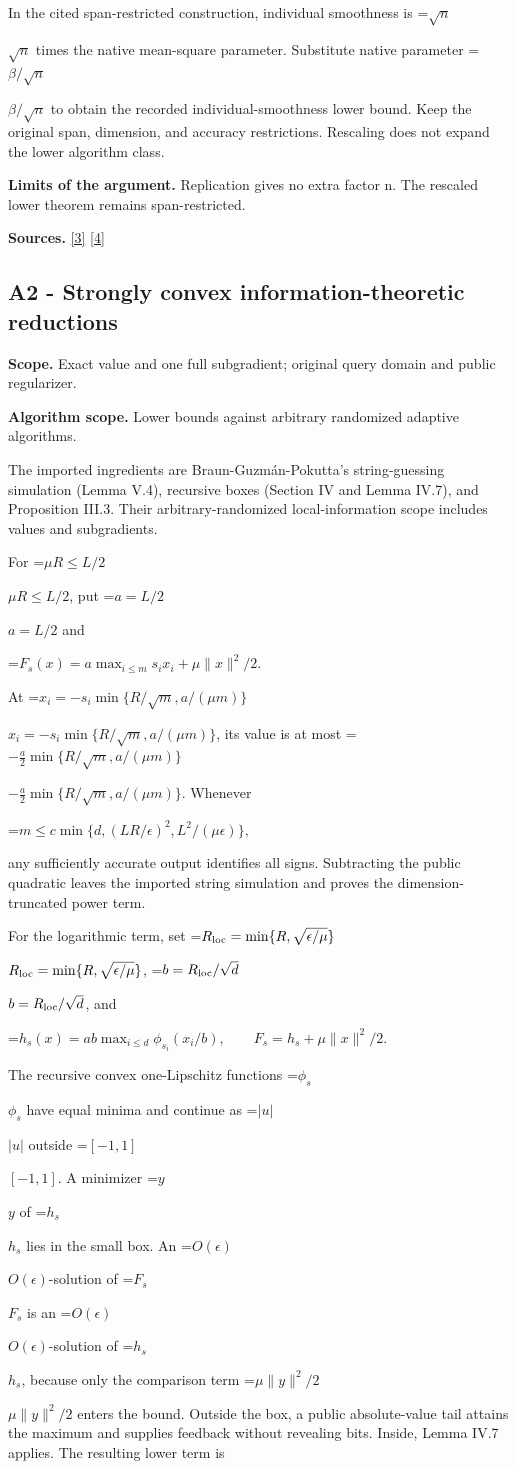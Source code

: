 \documentclass[10pt,a4paper]{article}
\newcommand{\AtlasMath}[1]{\par\begingroup\centering\setbox0=\hbox{$\displaystyle #1$}\ifdim\wd0>1.4\linewidth\typeout{ATLAS WIDE FORMULA: \the\wd0}\fi\ifdim\wd0>\linewidth\resizebox{\linewidth}{!}{\box0}\else\box0\fi\par\endgroup}
\newcommand{\AtlasInlineMath}[1]{\begingroup\setbox0=\hbox{$#1$}\ifdim\wd0>.4\linewidth\endgroup\AtlasMath{#1}\else\endgroup$#1$\fi}
\begin{document}
In the cited span-restricted construction, individual smoothness is \AtlasInlineMath{\sqrt n} times the native mean-square parameter. Substitute native parameter \AtlasInlineMath{\beta/\sqrt n} to obtain the recorded individual-smoothness lower bound. Keep the original span, dimension, and accuracy restrictions. Rescaling does not expand the lower algorithm class.

\textbf{Limits of the argument.} Replication gives no extra factor n. The rescaled lower theorem remains span-restricted.

\textbf{Sources.} \href{https://proceedings.mlr.press/v97/zhou19b/zhou19b.pdf}{[3]} \href{https://arxiv.org/pdf/1405.4980}{[4]}

\subsection{A2 - Strongly convex information-theoretic reductions}
\textbf{Scope.} Exact value and one full subgradient; original query domain and public regularizer.

\textbf{Algorithm scope.} Lower bounds against arbitrary randomized adaptive algorithms.

The imported ingredients are Braun-Guzmán-Pokutta's string-guessing simulation (Lemma V.4), recursive boxes (Section IV and Lemma IV.7), and Proposition III.3. Their arbitrary-randomized local-information scope includes values and subgradients.

For \AtlasInlineMath{\mu R\le L/2}, put \AtlasInlineMath{a=L/2} and

\AtlasMath{F_s(x)=a\max_{i\le m}s_ix_i+\mu\|x\|^2/2.}

At \AtlasInlineMath{x_i=-s_i\min\{R/\sqrt m,a/(\mu m)\}}, its value is at most
\AtlasInlineMath{-\tfrac a2\min\{R/\sqrt m,a/(\mu m)\}}.
Whenever


\AtlasMath{m\le c\min\{d,(LR/\epsilon)^2,L^2/(\mu\epsilon)\},}


any sufficiently accurate output identifies all signs. Subtracting the public quadratic leaves the imported string simulation and proves the dimension-truncated power term.

For the logarithmic term, set \AtlasInlineMath{R_{\rm loc}=\min\{R,\sqrt{\epsilon/\mu}\}}, \AtlasInlineMath{b=R_{\rm loc}/\sqrt d}, and

\AtlasMath{h_s(x)=ab\max_{i\le d}\phi_{s_i}(x_i/b),\qquad
F_s=h_s+\mu\|x\|^2/2.}

The recursive convex one-Lipschitz functions \AtlasInlineMath{\phi_s} have equal minima and continue as \AtlasInlineMath{|u|} outside \AtlasInlineMath{[-1,1]}. A minimizer \AtlasInlineMath{y} of \AtlasInlineMath{h_s} lies in the small box. An \AtlasInlineMath{O(\epsilon)}-solution of \AtlasInlineMath{F_s} is an \AtlasInlineMath{O(\epsilon)}-solution of \AtlasInlineMath{h_s}, because only the comparison term \AtlasInlineMath{\mu\|y\|^2/2} enters the bound. Outside the box, a public absolute-value tail attains the maximum and supplies feedback without revealing bits. Inside, Lemma IV.7 applies. The resulting lower term is
\end{document}
